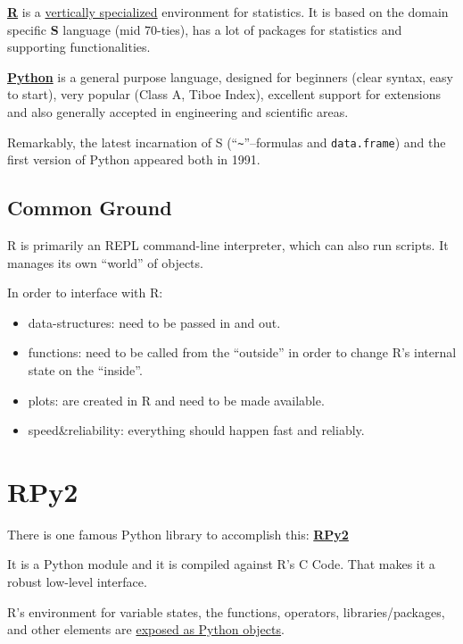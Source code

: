 \documentclass[
paper=128mm:96mm, %
fontsize=11pt, %
pagesize, %
parskip=half-, %
]{scrartcl} %
\theoremstyle{mythmstyle} %
\def\shorttitle{R meets Python}
\newcommand*{\runninghead}{\shorttitle} %
\newcommand*{\newhead}[1]{\renewcommand*{\runninghead}{\shorttitle: #1}}
\begin{document}
\href{http://www.r-project.org}{\textbf{R}}
is a \uline{vertically specialized} environment for statistics.
It is based on the domain specific \textbf{S} language (mid 70-ties),
has a lot of packages for statistics and supporting functionalities.

\href{http://www.python.org}{\textbf{Python}} is a general purpose language,
designed for beginners (clear syntax, easy to start),
very popular (Class A, Tiboe Index),
excellent support for extensions and
also generally accepted in engineering and scientific areas.

Remarkably, the latest incarnation of S
(``\texttt{\~}''--formulas and \texttt{data.frame})
and the first version of Python appeared both in 1991.

\clearpage


\newhead{Common Ground}
\subsection{Common Ground}

R is primarily an REPL command-line interpreter,
which can also run scripts.
It manages its own ``world'' of objects.

In order to interface with R:
\begin{itemize}
\item{data-structures:} need to be passed in and out.
\item{functions:} need to be called from the ``outside''
in order to change R's internal state on the ``inside''.
\item{plots:} are created in R and need to be made available.
\item{speed\&reliability:} everything should happen fast and reliably.
\end{itemize}


\clearpage
\newhead{RPy2}
\section{RPy2}

There is one famous Python library to accomplish this:
\href{http://rpy.sourceforge.net/rpy2.html}{\textbf{RPy2}}

It is a Python module and it is compiled against R's C Code.
That makes it a robust low-level interface.

R's environment for variable states, the functions, operators,
libraries/packages, and other elements are
\uline{exposed as Python objects}.
\end{document}

